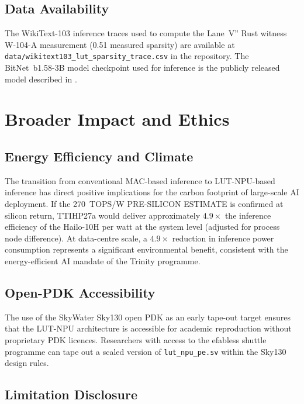 \subsection{Data Availability}

The WikiText-103 inference traces used to compute the Lane~V'' Rust witness
W-104-A measurement (0.51 measured sparsity) are available at
\texttt{data/wikitext103\_lut\_sparsity\_trace.csv} in the repository.
The BitNet~b1.58-3B model checkpoint used for inference is the publicly
released model described in \cite{bitnet_b158_2024}.

\section{Broader Impact and Ethics}
\label{sec:broader_impact}

\subsection{Energy Efficiency and Climate}

The transition from conventional MAC-based inference to LUT-NPU-based
inference has direct positive implications for the carbon footprint of
large-scale AI deployment.  If the 270~TOPS/W PRE-SILICON ESTIMATE is
confirmed at silicon return, TTIHP27a would deliver approximately $4.9\times$
the inference efficiency of the Hailo-10H per watt at the system level
(adjusted for process node difference).  At data-centre scale, a $4.9\times$
reduction in inference power consumption represents a significant
environmental benefit, consistent with the energy-efficient AI mandate
of the Trinity programme.

\subsection{Open-PDK Accessibility}

The use of the SkyWater Sky130 open PDK \cite{sky130_pdk} as an early
tape-out target ensures that the LUT-NPU architecture is accessible for
academic reproduction without proprietary PDK licences.  Researchers with
access to the efabless shuttle programme can tape out a scaled version
of \texttt{lut\_npu\_pe.sv} within the Sky130 design rules.

\subsection{Limitation Disclosure}

